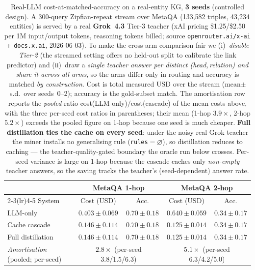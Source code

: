 \documentclass[11pt]{article}
\theoremstyle{plain}
\begin{document}
\begin{table}[t]
\centering
\small
\caption{Real-LLM cost-at-matched-accuracy on a real-entity KG, \textbf{3 seeds}
(controlled design). A 300-query Zipfian-repeat stream over MetaQA (133{,}582
triples, 43{,}234 entities) is served by a real \textbf{Grok~4.3} Tier-3 teacher
(xAI pricing \$1.25/\$2.50 per 1M input/output tokens, reasoning tokens billed;
source \texttt{openrouter.ai/x-ai} + \texttt{docs.x.ai}, 2026-06-03). To make the
cross-arm comparison fair we (i)~\emph{disable Tier-2} (the streamed setting
offers no held-out split to calibrate the link predictor) and (ii)~draw a
\emph{single teacher answer per distinct (head,\,relation) and share it across all
arms}, so the arms differ only in routing and accuracy is matched
\emph{by construction}. Cost is total measured USD over the stream
(mean$\pm$s.d.\ over seeds~0--2); accuracy is the gold-subset match. The
amortisation row reports the \emph{pooled} ratio cost(LLM-only)$/$cost(cascade)
of the mean costs above, with the three per-seed cost ratios in parentheses;
their mean (1-hop $3.9\times$, 2-hop $5.2\times$) exceeds the pooled figure on
1-hop because one seed is much cheaper. \textbf{Full distillation
ties the cache on every seed}: under the noisy real Grok teacher the miner
installs no generalising rule (\texttt{rules}$=\varnothing$), so distillation
reduces to caching --- the teacher-quality-gated boundary the oracle run below
crosses. Per-seed variance is large on 1-hop because the cascade caches only
\emph{non-empty} teacher answers, so the saving tracks the teacher's (seed-dependent)
answer rate.}
\label{tab:real_kg}
\begin{tabular}{lcccc}
\toprule
& \multicolumn{2}{c}{MetaQA 1-hop} & \multicolumn{2}{c}{MetaQA 2-hop} \\
\cmidrule(lr){2-3}\cmidrule(lr){4-5}
System & Cost (USD) & Acc. & Cost (USD) & Acc. \\
\midrule
LLM-only           & $0.403\pm0.069$ & $0.70\pm0.18$ & $0.640\pm0.059$ & $0.34\pm0.17$ \\
Cache cascade      & $0.146\pm0.114$ & $0.70\pm0.18$ & $0.125\pm0.014$ & $0.34\pm0.17$ \\
Full distillation  & $0.146\pm0.114$ & $0.70\pm0.18$ & $0.125\pm0.014$ & $0.34\pm0.17$ \\
\midrule
\multicolumn{1}{l}{\emph{Amortisation} (pooled; per-seed)}
  & \multicolumn{2}{c}{$\mathbf{2.8\times}$ (per-seed 3.8/1.5/6.3)}
  & \multicolumn{2}{c}{$\mathbf{5.1\times}$ (per-seed 6.3/4.2/5.0)} \\
\bottomrule
\end{tabular}


\end{table}
\end{document}
